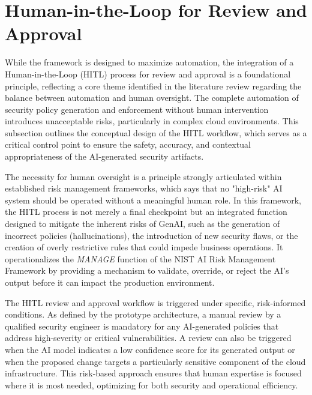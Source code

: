 
\section{Human-in-the-Loop for Review and Approval} %
\label{sub:Human-in-the-Loop for Review and Approval}

While the framework is designed to maximize automation, the integration of a Human-in-the-Loop (HITL) process for review and approval is a foundational principle, reflecting a core theme identified in the literature review regarding the balance between automation and human oversight. The complete automation of security policy generation and enforcement without human intervention introduces unacceptable risks, particularly in complex cloud environments. This subsection outlines the conceptual design of the HITL workflow, which serves as a critical control point to ensure the safety, accuracy, and contextual appropriateness of the AI-generated security artifacts.

The necessity for human oversight is a principle strongly articulated within established risk management frameworks, which says that no "high-risk" AI system should be operated without a meaningful human role. In this framework, the HITL process is not merely a final checkpoint but an integrated function designed to mitigate the inherent risks of GenAI, such as the generation of incorrect policies (hallucinations), the introduction of new security flaws, or the creation of overly restrictive rules that could impede business operations. It operationalizes the \textit{MANAGE} function of the NIST AI Risk Management Framework by providing a mechanism to validate, override, or reject the AI's output before it can impact the production environment\cite{barrett_actionable_2023}.

The HITL review and approval workflow is triggered under specific, risk-informed conditions. As defined by the prototype architecture, a manual review by a qualified security engineer is mandatory for any AI-generated policies that address high-severity or critical vulnerabilities. A review can also be triggered when the AI model indicates a low confidence score for its generated output or when the proposed change targets a particularly sensitive component of the cloud infrastructure. This risk-based approach ensures that human expertise is focused where it is most needed, optimizing for both security and operational efficiency.

